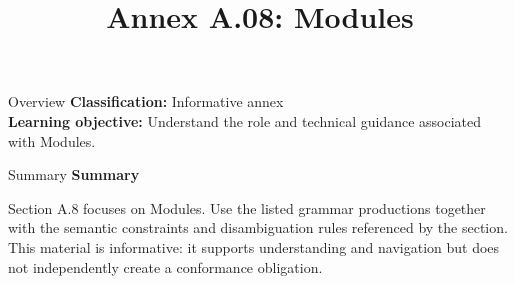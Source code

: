 \documentclass[10pt,letterpaper]{article}
\title{Annex A.08: Modules}
\author{}
\date{}
\begin{document}
\maketitle
\begin{CornellOverviewBox}{Overview}
\textbf{Classification:} Informative annex\\[2pt]
\textbf{Learning objective:} Understand the role and technical guidance associated with Modules.
\end{CornellOverviewBox}\begin{CornellSummaryBox}{Summary}
{\sffamily\bfseries\color{Accent} Summary}\par\vspace{3pt}Section A.8 focuses on Modules. Use the listed grammar productions together with the semantic constraints and disambiguation rules referenced by the section. This material is informative: it supports understanding and navigation but does not independently create a conformance obligation.
\end{CornellSummaryBox}
\end{document}
